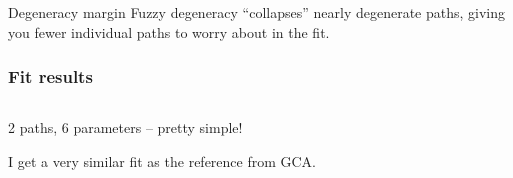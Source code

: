 \documentclass[10pt, xcolor=x11names, compress]{beamer}
\begin{document}
\begin{frame}
\begin{columns}[T]
\begin{column}{0.5\linewidth}
\begin{center}
      \end{center}
    \end{column}
  \end{columns}
  \begin{block}{Degeneracy margin}
    Fuzzy degeneracy ``collapses'' nearly degenerate paths, giving you
    fewer individual paths to worry about in the fit.
  \end{block}
\end{frame}

\begin{frame}
  \frametitle{Fit results}
  \begin{columns}[T]
    \begin{column}{0.5\linewidth}
      2 paths, 6 parameters -- pretty simple!

      \bigskip

      I get a very similar fit as the reference from GCA.

      \bigskip


\end{column}
\end{columns}
\end{frame}
\end{document}
